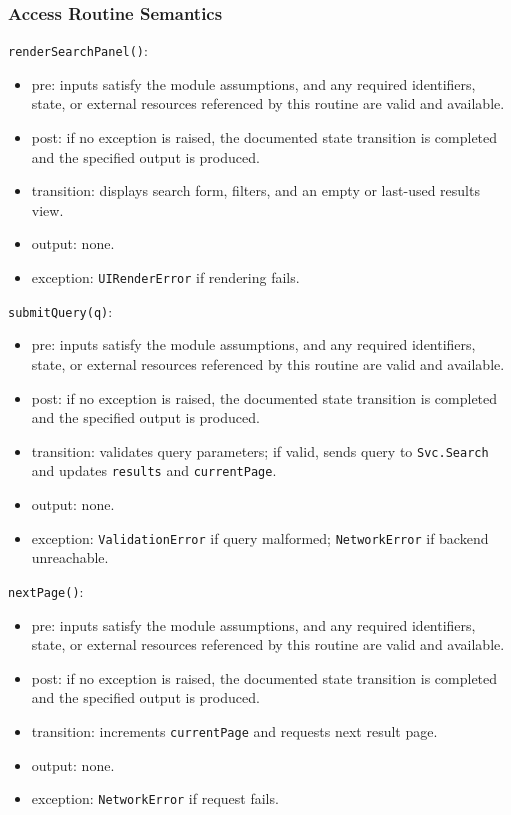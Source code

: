 \documentclass[12pt, titlepage]{article}
\begin{document}
\subsubsection{Access Routine Semantics}

\noindent \texttt{renderSearchPanel()}:
\begin{itemize}
    \item pre: inputs satisfy the module assumptions, and any required identifiers, state, or external resources referenced by this routine are valid and available.
    \item post: if no exception is raised, the documented state transition is completed and the specified output is produced.
    \item transition: displays search form, filters, and an empty or last-used results view.
    \item output: none.
    \item exception: \texttt{UIRenderError} if rendering fails.
\end{itemize}

\noindent \texttt{submitQuery(q)}:
\begin{itemize}
    \item pre: inputs satisfy the module assumptions, and any required identifiers, state, or external resources referenced by this routine are valid and available.
    \item post: if no exception is raised, the documented state transition is completed and the specified output is produced.
    \item transition: validates query parameters; if valid, sends query to \texttt{Svc.Search} and updates \texttt{results} and \texttt{currentPage}.
    \item output: none.
    \item exception: \texttt{ValidationError} if query malformed; \texttt{NetworkError} if backend unreachable.
\end{itemize}

\noindent \texttt{nextPage()}:
\begin{itemize}
    \item pre: inputs satisfy the module assumptions, and any required identifiers, state, or external resources referenced by this routine are valid and available.
    \item post: if no exception is raised, the documented state transition is completed and the specified output is produced.
    \item transition: increments \texttt{currentPage} and requests next result page.
    \item output: none.
    \item exception: \texttt{NetworkError} if request fails.
\end{itemize}
\end{document}
